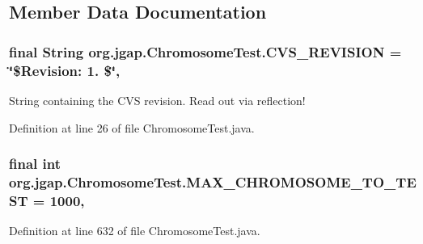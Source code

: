 \subsection{Member Data Documentation}
\hypertarget{classorg_1_1jgap_1_1_chromosome_test_a1a3841cd59e0654b6e17c762a59e2406}{
\subsubsection[{C\-V\-S\-\_\-\-R\-E\-V\-I\-S\-I\-O\-N}]{\setlength{\rightskip}{0pt plus 5cm}final String org.\-jgap.\-Chromosome\-Test.\-C\-V\-S\-\_\-\-R\-E\-V\-I\-S\-I\-O\-N = \char`\"{}\$Revision\-: 1. \$\char`\"{}\hspace{0.3cm}{\ttfamily [static]}, {\ttfamily [private]}}}\label{classorg_1_1jgap_1_1_chromosome_test_a1a3841cd59e0654b6e17c762a59e2406}
String containing the C\-V\-S revision. Read out via reflection! 

Definition at line 26 of file Chromosome\-Test.\-java.

\hypertarget{classorg_1_1jgap_1_1_chromosome_test_a1f7579cded003cd9b4169cc476bffdbc}{
\subsubsection[{M\-A\-X\-\_\-\-C\-H\-R\-O\-M\-O\-S\-O\-M\-E\-\_\-\-T\-O\-\_\-\-T\-E\-S\-T}]{\setlength{\rightskip}{0pt plus 5cm}final int org.\-jgap.\-Chromosome\-Test.\-M\-A\-X\-\_\-\-C\-H\-R\-O\-M\-O\-S\-O\-M\-E\-\_\-\-T\-O\-\_\-\-T\-E\-S\-T = 1000\hspace{0.3cm}{\ttfamily [static]}, {\ttfamily [private]}}}\label{classorg_1_1jgap_1_1_chromosome_test_a1f7579cded003cd9b4169cc476bffdbc}


Definition at line 632 of file Chromosome\-Test.\-java.



